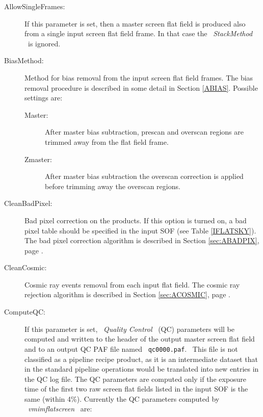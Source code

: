 \begin{description}

\item [AllowSingleFrames:]  If this parameter is set, then a master screen
                        flat field is produced also from a single input 
                        screen flat field frame.
                        In that case the \ {\it StackMethod} \ is ignored.

\item [BiasMethod:]     Method for bias removal from the input screen
                        flat field frames.
                        The bias removal procedure is described in some
                        detail in Section \ref{ABIAS}. Possible settings are:

\begin{description}
  \item [Master:]       After master bias subtraction, prescan and
                        overscan regions are trimmed away from the
                        flat field frame.

  \item [Zmaster:]      After master bias subtraction the overscan correction
                        is applied before trimming away the overscan regions.
\end{description}

\item [CleanBadPixel:]  Bad pixel correction on the products.
                        If this option is turned on, a bad pixel
                        table should be specified in the input SOF
                        (see Table \ref{IFLATSKY}). The bad pixel
                        correction algorithm is described in Section
                        \ref{sec:ABADPIX}, page \pageref{sec:ABADPIX}.

\item [CleanCosmic:]    Cosmic ray events removal from each input flat field.
                        The cosmic ray rejection algorithm is described 
                        in Section \ref{sec:ACOSMIC}, page \pageref{sec:ACOSMIC}.

\item [ComputeQC:]      If this parameter is set, \ {\it Quality Control}
                        \ (QC) parameters will be computed and written to 
                        the header of the output master screen flat field 
                        and to an 
                        output QC PAF file named \ {\tt qc0000.paf}. 
                        \ This file is not classified as a pipeline recipe 
                        product, as it is an intermediate dataset 
                        that in the standard pipeline operations would 
                        be translated into new entries in the QC log file. 
                        The QC parameters are computed only if the exposure 
                        time of the first two raw screen flat fields listed 
                        in the input SOF is the same (within 4\%).
                        Currently the QC parameters computed by 
                        \ {\it vmimflatscreen} \ are:


\end{description}
